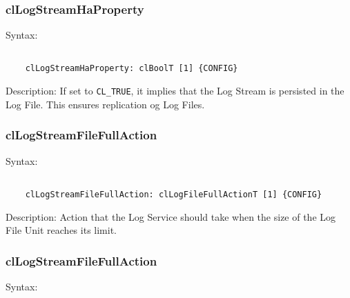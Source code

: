 \begin{flushleft}
\subsubsection{clLogStreamHaProperty}
\begin{Desc}
\item[Syntax:]
\footnotesize\begin{verbatim}        	

	clLogStreamHaProperty: clBoolT [1] {CONFIG}
	\end{verbatim}
	\normalsize
\end{Desc}

\begin{Desc}
 \item[Description:]
If set to {\tt{CL\_\-TRUE}}, it implies that the Log Stream is persisted in the Log File. This ensures replication og Log Files.
\end{Desc}



\subsubsection{clLogStreamFileFullAction}
\begin{Desc}
\item[Syntax:]
\footnotesize\begin{verbatim}        	

	clLogStreamFileFullAction: clLogFileFullActionT [1] {CONFIG}
	\end{verbatim}
	\normalsize
\end{Desc}

\begin{Desc}
 \item[Description:]
Action that the Log Service should take when the size of the Log File Unit reaches its limit.
\end{Desc}



\subsubsection{clLogStreamFileFullAction}
\begin{Desc}
\item[Syntax:]
\footnotesize\begin{verbatim}        	


\end{verbatim}
\end{Desc}
\end{flushleft}
